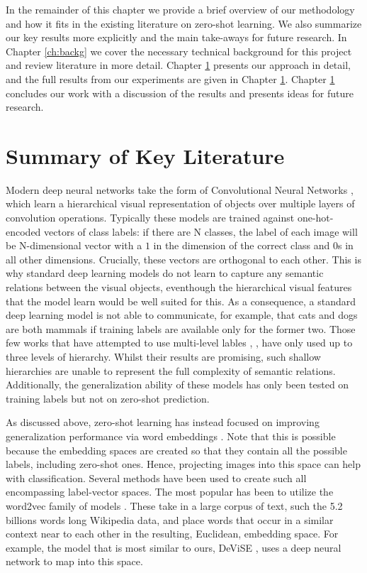 \documentclass[12pt]{report}
\begin{document}
In the remainder of this chapter we provide a brief overview of our methodology and how it fits in the existing literature on zero-shot learning. We also summarize our key results more explicitly and the main take-aways for future research. In Chapter \ref{ch:backg} we cover the necessary technical background for this project and review literature in more detail. Chapter \ref{} presents our approach in detail, and the full results from our experiments are given in Chapter \ref{}. Chapter \ref{} concludes our work with a discussion of the results and presents ideas for future research.

\section{Summary of Key Literature}
Modern deep neural networks take the form of Convolutional Neural Networks \cite{Lecun2015}, which learn a hierarchical visual representation of objects over multiple layers of convolution operations. Typically these models are trained against one-hot-encoded vectors of class labels: if there are N classes, the label of each image will be N-dimensional vector with a $1$ in the dimension of the correct class and 0s in all other dimensions. Crucially, these vectors are orthogonal to each other. This is why standard deep learning models do not learn to capture any semantic relations between the visual objects, eventhough the hierarchical visual features that the model learn would be well suited for this. As a consequence, a standard deep learning model is not able to communicate, for example, that cats and dogs are both mammals if training labels are available only for the former two. Those few works that have attempted to use multi-level lables \cite{Wang2015}, \cite{Peterson2018}, have only used up to three levels of hierarchy. Whilst their results are promising, such shallow hierarchies are unable to represent the full complexity of semantic relations. Additionally, the generalization ability of these models has only been tested on training labels but not on zero-shot prediction.

As discussed above, zero-shot learning has instead focused on improving generalization performance via word embeddings \cite{Palatucci2009, Socher, Huang2012, Frome2013, Norouzi2013}. Note that this is possible because the embedding spaces are created so that they contain all the possible labels, including zero-shot ones. Hence, projecting images into this space can help with classification. Several methods have been used to create such all encompassing label-vector spaces. The most popular has been to utilize the word2vec family of models \cite{Mikolov, Mikolov2013}. These take in a large corpus of text, such the 5.2 billions words long Wikipedia data, and place words that occur in a similar context near to each other in the resulting, Euclidean, embedding space. For example, the model that is most similar to ours, DeViSE \cite{Frome2013}, uses a deep neural network to map into this space. 
\end{document}
